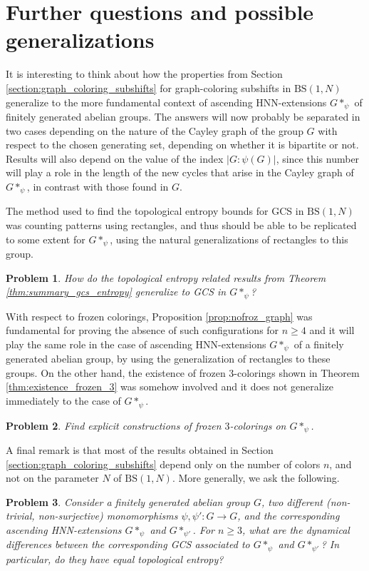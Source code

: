 \documentclass[cupthm,crop,info]{CUP-JNL-ETS}%
\theoremstyle{cupplain}
\newtheorem*{problem*}{Problem}
\theoremstyle{cupdefinition}
\theoremstyle{cupremark}
\theoremstyle{cupproof}
\numberwithin{equation}{section}
\newcommand{\BS}[1][N]{\mathrm{BS}(1,#1)}
\begin{document}
\section{Further questions and possible generalizations}
\label{section: further questions}

It is interesting to think about how the properties from Section \ref{section:graph_coloring_subshifts} for graph-coloring subshifts in $\BS$ generalize to the more fundamental context of ascending HNN-extensions $G*_{\psi}$ of finitely generated abelian groups. The answers will now probably be separated in two cases depending on the nature of the Cayley graph of the group $G$ with respect to the chosen generating set, depending on whether it is bipartite or not. Results will also depend on the value of the index $|G:\psi(G)|$, since this number will play a role in the length of the new cycles that arise in the Cayley graph of $G*_{\psi}$, in contrast with those found in $G$.

The method used to find the topological entropy bounds for GCS in $\BS$ was counting patterns using rectangles, and thus should be able to be replicated to some extent for $G*_{\psi}$, using the natural generalizations of rectangles to this group. 
\begin{problem*}
	How do the topological entropy related results from Theorem \ref{thm:summary_gcs_entropy} generalize to GCS in $G*_{\psi}$?
\end{problem*}
With respect to frozen colorings, Proposition \ref{prop:nofroz_graph} was fundamental for proving the absence of such configurations for $n\ge 4$ and it will play the same role in the case of ascending HNN-extensions $G*_{\psi}$ of a finitely generated abelian group, by using the generalization of rectangles to these groups. On the other hand, the existence of frozen $3$-colorings shown in Theorem \ref{thm:existence_frozen_3} was somehow involved and it does not generalize immediately to the case of $G*_{\psi}$.
\begin{problem*}
	Find explicit constructions of frozen $3$-colorings on $G*_{\psi}$.
\end{problem*}

A final remark is that most of the results obtained in Section \ref{section:graph_coloring_subshifts} depend only on the number of colors $n$, and not on the parameter $N$ of $\BS$. More generally, we ask the following.
\begin{problem*}
	Consider a finitely generated abelian group $G$, two different (non-trivial, non-surjective) monomorphisms $\psi, \psi':G\to G$, and the corresponding ascending HNN-extensions $G*_{\psi}$ and $G*_{\psi'}$. For $n\ge 3$, what are the dynamical differences between the corresponding GCS associated to $G*_{\psi}$ and $G*_{\psi'}$? In particular, do they have equal topological entropy?
\end{problem*}
\end{document}
